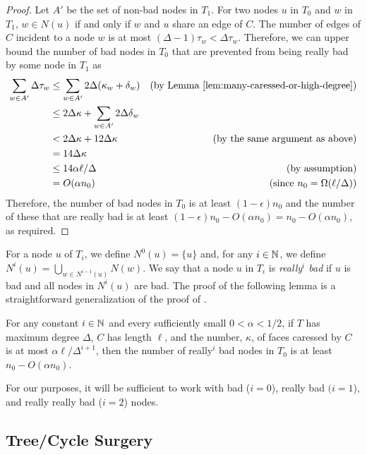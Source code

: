 \documentclass{patmorin}
\begin{document}
\begin{proof}
  Let $A'$ be the set of non-bad nodes in $T_1$.  For two
  nodes $u$ in $T_0$ and $w$ in $T_1$,  $w\in N(u)$ if and only if $w$
  and $u$ share an edge of $C$.  The number of edges of $C$ incident to a node $w$ is at most $(\Delta-1)\tau_w < \Delta\tau_w$.  Therefore, we can upper bound the number of bad nodes in $T_0$ that are prevented from being really bad by some node in $T_1$ as
  \begin{align*}
   \sum_{w\in A'}\Delta \tau_w  
    & \le  \sum_{w\in A'}2\Delta(\kappa_w + \delta_w) & \text{(by \lemref{many-caressed-or-high-degree})} \\
    & \le  2\Delta\kappa + \sum_{w\in A'}2\Delta\delta_w \\
    & < 2\Delta\kappa + 12\Delta\kappa & \text{(by the same argument as above)}\\
    & = 14\Delta\kappa \\
    & \le 14\alpha\ell/\Delta & \text{(by assumption)}\\
    & = O(\alpha n_0) & \text{(since $n_0=\Omega(\ell/\Delta)$)}
  \end{align*}
  Therefore, the number of bad nodes in $T_0$ is at least
  $(1-\epsilon)n_0$ and the number of these that are really bad is
  at least $(1-\epsilon)n_0 - O(\alpha n_0) = n_0-O(\alpha n_0)$,
  as required.
\end{proof}

For a node $u$ of $T_i$, we define $N^0(u) = \{u\}$ and, for any $i\in\mathbb{N}$,
we define $N^{i}(u)=\bigcup_{w\in N^{i-1}(u)} N(w)$.   We say that a node
$u$ in $T_i$ is \emph{really$^{i}$ bad} if $u$ is bad and all nodes in
$N^i(u)$ are bad.  The proof of the following lemma is a straightforward
generalization of the proof of .

\begin{lem}
  For any constant $i\in\mathbb{N}$ and every sufficiently small $0<\alpha < 1/2$,  
  if $T$ has maximum degree $\Delta$, $C$ has length $\ell$, and the number,
  $\kappa$, of faces caressed by $C$ is at most $\alpha\ell/\Delta^{i+1}$, then
  the number of really$^i$ bad nodes in $T_0$ is at least $n_0-O(\alpha n_0)$.
\end{lem}

For our purposes, it will be sufficient to work with bad ($i=0$), really
bad $(i=1$), and really really bad ($i=2$) nodes.

\subsection{Tree/Cycle Surgery}
\end{document}
